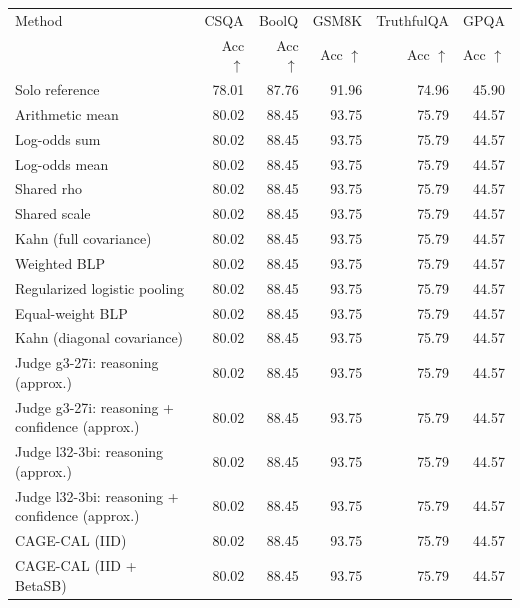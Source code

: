 \begin{tabular}{lrrrrr}
\toprule
Method & \multicolumn{1}{c}{CSQA} & \multicolumn{1}{c}{BoolQ} & \multicolumn{1}{c}{GSM8K} & \multicolumn{1}{c}{TruthfulQA} & \multicolumn{1}{c}{GPQA} \\
 & Acc $\uparrow$ & Acc $\uparrow$ & Acc $\uparrow$ & Acc $\uparrow$ & Acc $\uparrow$ \\
\midrule
Solo reference & 78.01 & 87.76 & 91.96 & 74.96 & 45.90 \\
Arithmetic mean & 80.02 & 88.45 & 93.75 & 75.79 & 44.57 \\
Log-odds sum & 80.02 & 88.45 & 93.75 & 75.79 & 44.57 \\
Log-odds mean & 80.02 & 88.45 & 93.75 & 75.79 & 44.57 \\
Shared rho & 80.02 & 88.45 & 93.75 & 75.79 & 44.57 \\
Shared scale & 80.02 & 88.45 & 93.75 & 75.79 & 44.57 \\
Kahn (full covariance) & 80.02 & 88.45 & 93.75 & 75.79 & 44.57 \\
Weighted BLP & 80.02 & 88.45 & 93.75 & 75.79 & 44.57 \\
Regularized logistic pooling & 80.02 & 88.45 & 93.75 & 75.79 & 44.57 \\
Equal-weight BLP & 80.02 & 88.45 & 93.75 & 75.79 & 44.57 \\
Kahn (diagonal covariance) & 80.02 & 88.45 & 93.75 & 75.79 & 44.57 \\
Judge g3-27i: reasoning (approx.) & 80.02 & 88.45 & 93.75 & 75.79 & 44.57 \\
Judge g3-27i: reasoning + confidence (approx.) & 80.02 & 88.45 & 93.75 & 75.79 & 44.57 \\
Judge l32-3bi: reasoning (approx.) & 80.02 & 88.45 & 93.75 & 75.79 & 44.57 \\
Judge l32-3bi: reasoning + confidence (approx.) & 80.02 & 88.45 & 93.75 & 75.79 & 44.57 \\
CAGE-CAL (IID) & 80.02 & 88.45 & 93.75 & 75.79 & 44.57 \\
CAGE-CAL (IID + BetaSB) & 80.02 & 88.45 & 93.75 & 75.79 & 44.57 \\
\bottomrule
\end{tabular}
